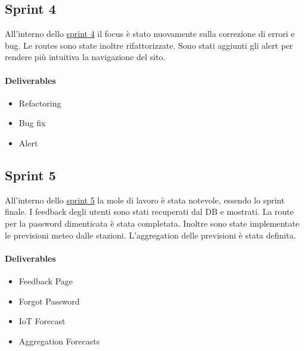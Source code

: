 \subsection{Sprint 4}
All'interno dello  \href{https://github.com/orgs/Weather-Vortex/projects/6}{sprint 4} il focus è stato nuovamente sulla correzione di errori e bug. Le routes sono state inoltre rifattorizzate. Sono stati aggiunti gli alert per rendere più intuitiva la navigazione del sito. 
\paragraph{Deliverables} 
\begin{itemize}
    \item Refactoring 
    \item Bug fix
    \item Alert
\end{itemize}

\subsection{Sprint 5}
All'interno dello  \href{https://github.com/orgs/Weather-Vortex/projects/7}{sprint 5} la mole di lavoro è stata notevole, essendo lo sprint finale. I feedback degli utenti sono stati recuperati dal DB e mostrati. La route per la password dimenticata è stata completata.
Inoltre sono state implementate le previsioni meteo dalle stazioni. L'aggregation delle previsioni è stata definita. 
\paragraph{Deliverables} 
\begin{itemize}
    \item Feedback Page 
    \item Forgot Password
    \item IoT Forecast
    \item Aggregation Forecasts
\end{itemize}

